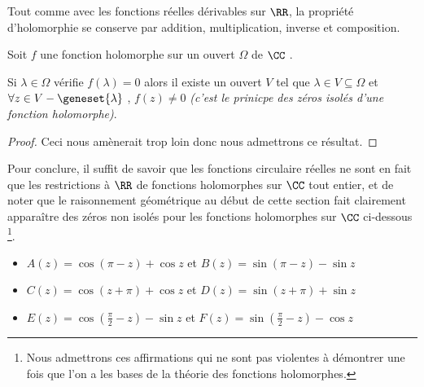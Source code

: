 \medskip

Tout comme avec les fonctions réelles dérivables sur $\RR$, la propriété d'holomorphie se conserve par addition, multiplication, inverse et composition.


\medskip

\begin{fact} \label{holo-nullity}
	Soit $f$ une fonction holomorphe sur un ouvert $\Omega$ de $\CC$ . 
	
	\smallskip
	
	Si $\lambda \in \Omega$ vérifie $f(\lambda) = 0$ alors il existe un ouvert $V$ tel que $\lambda \in V \subseteq \Omega$ et $\forall z \in V - \geneset{\lambda}$ , $f(z) \neq 0$ 
	\emph{(c'est le prinicpe des zéros isolés d'une fonction holomorphe)}. 
\end{fact}


\begin{proof}
	Ceci nous amènerait trop loin donc nous admettrons ce résultat.
\end{proof}


\medskip

Pour conclure, il suffit de savoir que les fonctions circulaire réelles ne sont en fait que les restrictions à $\RR$ de fonctions holomorphes sur $\CC$ tout entier, et de noter que le raisonnement géométrique au début de cette section fait clairement apparaître des zéros non isolés pour les fonctions holomorphes sur $\CC$ ci-dessous
\footnote{
	Nous admettrons ces affirmations qui ne sont pas violentes à démontrer une fois que l'on a les bases de la théorie des fonctions holomorphes.
}.

\begin{itemize}[label=\small\textbullet]
	\item $A(z) = \cos (\pi - z) + \cos z$ 
	   et $B(z) =\sin (\pi - z) - \sin z$ 

	\smallskip
	\item $C(z) =\cos (z + \pi) + \cos z$ 
	   et $D(z) =\sin (z + \pi) + \sin z$

	\smallskip
	\item $E(z) =\cos \left( \frac{\pi}{2} - z \right) - \sin z$ 
	   et $F(z) =\sin \left( \frac{\pi}{2} - z \right) - \cos z$ 
\end{itemize}

